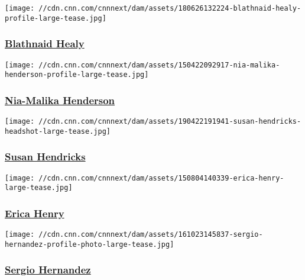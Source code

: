 \href{/profiles/blathnaid-healy}{}

\texttt{[image: //cdn.cnn.com/cnnnext/dam/assets/180626132224-blathnaid-healy-profile-large-tease.jpg]}

\hypertarget{blathnaid-healy}{%
\subsubsection{\texorpdfstring{\href{/profiles/blathnaid-healy}{Blathnaid
Healy}}{Blathnaid Healy}}\label{blathnaid-healy}}

\href{/profiles/nia-malika-henderson}{}

\texttt{[image: //cdn.cnn.com/cnnnext/dam/assets/150422092917-nia-malika-henderson-profile-large-tease.jpg]}

\hypertarget{nia-malika-henderson}{%
\subsubsection{\texorpdfstring{\href{/profiles/nia-malika-henderson}{Nia-Malika
Henderson}}{Nia-Malika Henderson}}\label{nia-malika-henderson}}

\href{/profiles/susan-hendricks-profile}{}

\texttt{[image: //cdn.cnn.com/cnnnext/dam/assets/190422191941-susan-hendricks-headshot-large-tease.jpg]}

\hypertarget{susan-hendricks}{%
\subsubsection{\texorpdfstring{\href{/profiles/susan-hendricks-profile}{Susan
Hendricks}}{Susan Hendricks}}\label{susan-hendricks}}

\href{/profiles/erica-henry}{}

\texttt{[image: //cdn.cnn.com/cnnnext/dam/assets/150804140339-erica-henry-large-tease.jpg]}

\hypertarget{erica-henry-}{%
\subsubsection{\texorpdfstring{\href{/profiles/erica-henry}{Erica Henry
}}{Erica Henry }}\label{erica-henry-}}

\href{/profiles/sergio-hernandez}{}

\texttt{[image: //cdn.cnn.com/cnnnext/dam/assets/161023145837-sergio-hernandez-profile-photo-large-tease.jpg]}

\hypertarget{sergio-hernandez}{%
\subsubsection{\texorpdfstring{\href{/profiles/sergio-hernandez}{Sergio
Hernandez}}{Sergio Hernandez}}\label{sergio-hernandez}}

